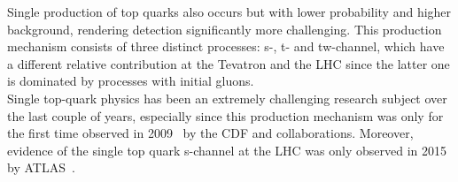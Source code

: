 Single production of top quarks also occurs but with lower probability and higher background, rendering detection significantly more challenging.
This production mechanism consists of three distinct processes: s-, t- and tw-channel, which have a different relative contribution at the Tevatron and the LHC since the latter one is dominated by processes with initial gluons.
\\
Single top-quark physics has been an extremely challenging research subject over the last couple of years, especially since this production mechanism was only for the first time observed in 2009~\cite{STDiscovery1, STDiscovery2} by the CDF and \DZ collaborations. Moreover, evidence of the single top quark s-channel at the LHC was only observed in 2015 by ATLAS~\cite{AtlasSTsChEvidence}.
